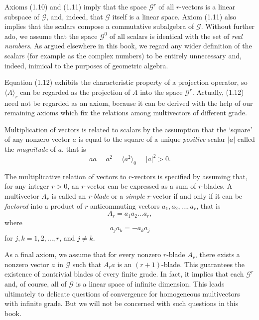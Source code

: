 \documentclass[fleqn]{scrartcl}
\numberwithin{equation}{section}
\begin{document}
\noindent Axioms (1.10) and (1.11) imply that the space \(\mathscr{G}^r\) of all \(r\)-vectors is a linear subspace of \(\mathscr{G}\), and, indeed, that \(\mathscr{G}\) itself is a linear space. Axiom (1.11) also implies that the scalars compose a commutative subalgebra of \(\mathscr{G}\). Without further ado, we assume that the space \(\mathscr{G}^0\) of all scalars is identical with the set of \textit{real numbers}. As argued elsewhere in this book, we regard any wider definition of the scalars (for example as the complex numbers) to be entirely unnecessary and, indeed, inimical to the purposes of geometric algebra.

\vspace{1em}
\noindent Equation (1.12) exhibits the characteristic property of a projection operator, so \(\langle A \rangle_r\) can be regarded as the projection of \(A\) into the space \(\mathscr{G}^r\). Actually, (1.12) need not be regarded as an axiom, because it can be derived with the help of our remaining axioms which fix the relations among multivectors of different grade.

\vspace{1em}
\noindent Multiplication of vectors is related to scalars by the assumption that the `square' of any nonzero vector \(a\) is equal to the square of a unique \textit{positive} scalar \(|a|\) called the \textit{magnitude} of \(a\), that is
\begin{equation}
aa = a^2 = \langle a^2 \rangle_0 = |a|^2 > 0. \tag{1.13}
\end{equation}

\vspace{1em}
\noindent The multiplicative relation of vectors to \(r\)-vectors is specified by assuming that, for any integer \(r > 0\), an \(r\)-vector can be expressed as a sum of \(r\)-blades. A multivector \(A_r\) is called an \textit{r-blade} or a \textit{simple} \(r\)-vector if and only if it can be \textit{factored} into a product of \(r\) anticommuting vectors \(a_1, a_2, \dots, a_r\), that is
\begin{equation}
A_r = a_1 a_2 \dots a_r, \tag{1.14a}
\end{equation}
where
\begin{equation}
a_j a_k = -a_k a_j \tag{1.14b}
\end{equation}
for \(j, k = 1, 2, \dots, r\), and \(j \neq k\).

\vspace{1em}
\noindent As a final axiom, we assume that for every nonzero \(r\)-blade \(A_r\), there exists a nonzero vector \(a\) in \(\mathscr{G}\) such that \(A_r a\) is an \((r + 1)\)-blade. This guarantees the existence of nontrivial blades of every finite grade. In fact, it implies that each \(\mathscr{G}^r\) and, of course, all of \(\mathscr{G}\) is a linear space of infinite dimension. This leads ultimately to delicate questions of convergence for homogeneous multivectors with infinite grade. But we will not be concerned with such questions in this book.
\end{document}
